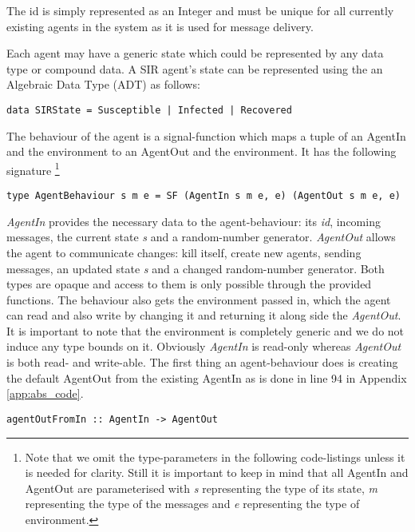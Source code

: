 The id is simply represented as an Integer and must be unique for all currently existing agents in the system as it is used for message delivery. %

Each agent may have a generic state which could be represented by any data type or compound data. A SIR agent's state can be represented using the an Algebraic Data Type (ADT) as follows:
\begin{verbatim}
data SIRState = Susceptible | Infected | Recovered
\end{verbatim}

The behaviour of the agent is a signal-function which maps a tuple of an AgentIn and the environment to an AgentOut and the environment. It has the following signature \footnote{Note that we omit the type-parameters in the following code-listings unless it is needed for clarity. Still it is important to keep in mind that all AgentIn and AgentOut are parameterised with \textit{s} representing the type of its state, \textit{m} representing the type of the messages and \textit{e} representing the type of environment.} 
\begin{verbatim}
type AgentBehaviour s m e = SF (AgentIn s m e, e) (AgentOut s m e, e)
\end{verbatim}

\textit{AgentIn} provides the necessary data to the agent-behaviour: its \textit{id}, incoming messages, the current state \textit{s} and a random-number generator. \textit{AgentOut} allows the agent to communicate changes: kill itself, create new agents, sending messages, an updated state \textit{s} and a changed random-number generator. Both types are opaque and access to them is only possible through the provided functions. The behaviour also gets the environment passed in, which the agent can read and also write by changing it and returning it along side the \textit{AgentOut}. It is important to note that the environment is completely generic and we do not induce any type bounds on it. Obviously \textit{AgentIn} is read-only whereas \textit{AgentOut} is both read- and write-able. The first thing an agent-behaviour does is creating the default AgentOut from the existing AgentIn as is done in line 94 in Appendix \ref{app:abs_code}.

\begin{verbatim}
agentOutFromIn :: AgentIn -> AgentOut
\end{verbatim}

